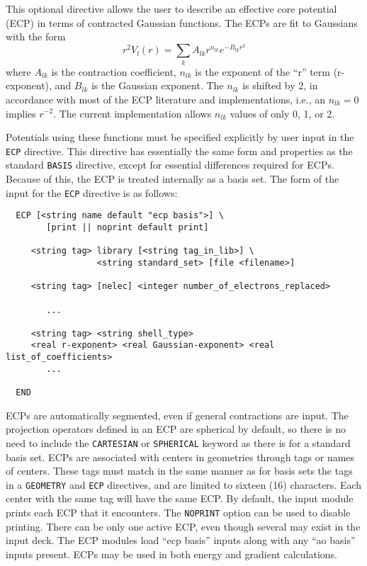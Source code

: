 \label{sec:ecp}

This optional directive allows the user to describe an effective core
potential (ECP) in terms of contracted Gaussian functions.  The ECPs
are fit to Gaussians with the form
\[
 r^2V_l(r) = \sum_{k} A_{lk} r^{n_{lk}} e^{-B_{lk}r^{2}}
\]
where $A_{lk}$ is the contraction coefficient, $n_{lk}$ is the
exponent of the ``r'' term (r-exponent), and $B_{lk}$ is the Gaussian
exponent.  The $n_{lk}$ is shifted by 2, in accordance with most of the ECP
literature and implementations, i.e., an $n_{lk} = 0$ implies
$r^{-2}$.  The current implementation allows $n_{lk}$ values
of only 0, 1, or 2. 

Potentials using these functions must be specified explicitly by user input
in the \verb+ECP+ directive.  This directive has essentially the same form
and properties as the standard \verb+BASIS+ directive, except for essential
differences required for ECPs.  Because of this, the ECP is treated
internally as a basis set. The form of the input for the
\verb+ECP+ directive is as follows:


\begin{verbatim}
  ECP [<string name default "ecp basis">] \
        [print || noprint default print]

     <string tag> library [<string tag_in_lib>] \
                  <string standard_set> [file <filename>]

     <string tag> [nelec] <integer number_of_electrons_replaced>
 
        ...

     <string tag> <string shell_type>
     <real r-exponent> <real Gaussian-exponent> <real list_of_coefficients>
        ...
     
  END
\end{verbatim}    

ECPs are automatically segmented, even if general contractions are input.
The projection operators defined in an ECP are spherical by default, so
there is no need to include the \verb+CARTESIAN+ or \verb+SPHERICAL+ keyword
as there is for a standard basis set.  ECPs are associated with centers in
geometries through tags or names of centers.  These tags must match in the
same manner as for basis sets the tags in a \verb+GEOMETRY+ and
\verb+ECP+ directives, and are limited to sixteen (16) characters.
Each center with the same tag will have the same ECP.  By default, the
input module prints each ECP that it encounters.  The \verb+NOPRINT+
option can be used to disable printing.  There can be only one active
ECP, even though several may exist in the input deck.  The ECP modules
load ``ecp basis'' inputs along with any ``ao basis'' inputs present.
ECPs may be used in both energy and gradient calculations.


